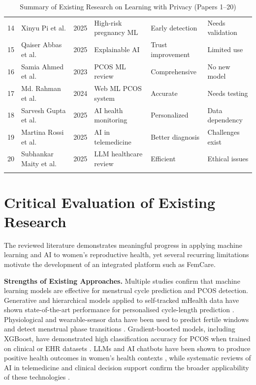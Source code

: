 \begin{center}
\begin{longtable}{|c|p{3cm}|c|p{3.5cm}|p{3cm}|p{3cm}|}
14 & Xinyu Pi et al. \cite{pi2025} & 2025 & High-risk pregnancy ML & Early detection & Needs validation \\
15 & Qaiser Abbas et al. \cite{abbas2025} & 2025 & Explainable AI & Trust improvement & Limited use \\
16 & Samia Ahmed et al. \cite{ahmed2023} & 2023 & PCOS ML review & Comprehensive & No new model \\
17 & Md. Rahman et al. \cite{rahman2024} & 2024 & Web ML PCOS system & Accurate & Needs testing \\
18 & Sarvesh Gupta et al. \cite{maity2025} & 2025 & AI health monitoring & Personalized & Data dependency \\
19 & Martina Rossi et al. \cite{rossi2025} & 2025 & AI in telemedicine & Better diagnosis & Challenges exist \\
20 & Subhankar Maity et al. \cite{maity2025} & 2025 & LLM healthcare review & Efficient & Ethical issues \\
\hline
\caption{Summary of Existing Research on Learning with Privacy (Papers 1--20)}
\end{longtable}
\end{center}

\section{Critical Evaluation of Existing Research}
\label{sec:critical-eval}

The reviewed literature demonstrates meaningful progress in applying machine learning and AI to women's reproductive health, yet several recurring limitations motivate the development of an integrated platform such as FemCare.

\textbf{Strengths of Existing Approaches.}
Multiple studies confirm that machine learning models are effective for menstrual cycle prediction and PCOS detection. Generative and hierarchical models applied to self-tracked mHealth data have shown state-of-the-art performance for personalised cycle-length prediction \cite{li2021,urteaga2017,li2020}. Physiological and wearable-sensor data have been used to predict fertile windows and detect menstrual phase transitions \cite{yu2022,goodale2019,kilungeja2025}. Gradient-boosted models, including XGBoost, have demonstrated high classification accuracy for PCOS when trained on clinical or EHR datasets \cite{ahmed2023,zad2024,rahman2024}. LLMs and AI chatbots have been shown to produce positive health outcomes in women's health contexts \cite{maity2025,wang2024,kim2024}, while systematic reviews of AI in telemedicine and clinical decision support confirm the broader applicability of these technologies \cite{rossi2025,abbas2025}.


